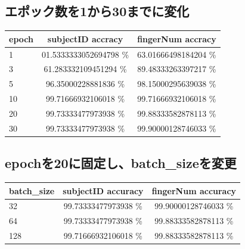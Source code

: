 \documentclass[a4paper, 11pt, titlepage]{jsarticle}
\begin{document}
\subsection{エポック数を1から30までに変化}
\begin{table}[htb]
  \begin{tabular}{|l|c|c|}
    \hline
    epoch & subjectID accracy & fingerNum accracy \\ \hline
    1 & 01.5333333052694798 \% & 63.01666498184204 \%  \\ \hline
    3 & 61.283332109451294 \% & 89.48333263397217 \% \\ \hline
    5 & 96.35000228881836 \% & 98.15000295639038 \%  \\ \hline
    10 & 99.71666932106018 \% & 99.71666932106018 \%  \\ \hline
    20 & 99.73333477973938 \% & 99.88333582878113 \%  \\ \hline
    30 & 99.73333477973938 \% & 99.90000128746033 \% \\ \hline
  \end{tabular}
\end{table}

\subsection{epochを20に固定し、batch\_sizeを変更}%
\begin{table}[htb]
  \begin{tabular}{|l|c|c|}
    \hline
    batch\_size & subjectID accuracy & fingerNum accuracy  \\ \hline
    32 & 99.73333477973938 \% & 99.90000128746033 \% \\ \hline
    64 & 99.73333477973938 \% & 99.88333582878113 \% \\ \hline
    128 & 99.71666932106018 \% & 99.88333582878113 \% \\ \hline
  \end{tabular}
\end{table}

\end{document}
